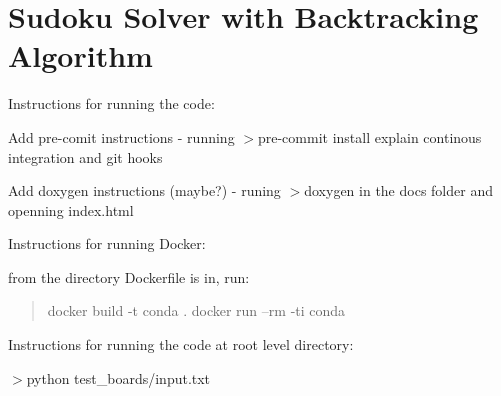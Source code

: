 \chapter{Sudoku Solver with Backtracking Algorithm}
\hypertarget{index}{}\label{index}
\label{index_md__2_users_2mertdaloglu_2_desktop_2_course_work_2_r_c__coursework_2smd89_2_r_e_a_d_m_e}%
%
 Instructions for running the code\+:
\begin{DoxyItemize}
\item Add pre-\/comit instructions -\/ running \texorpdfstring{$>$}{>}pre-\/commit install explain continous integration and git hooks
\item Add doxygen instructions (maybe?) -\/ runing \texorpdfstring{$>$}{>}doxygen in the docs folder and openning index.\+html
\end{DoxyItemize}

Instructions for running Docker\+:
\begin{DoxyItemize}
\item from the directory Dockerfile is in, run\+:
\end{DoxyItemize}

\begin{quote}
docker build -\/t conda . docker run --rm -\/ti conda \end{quote}
Instructions for running the code at root level directory\+:

\texorpdfstring{$>$}{>}python  test\+\_\+boards/input.\+txt
